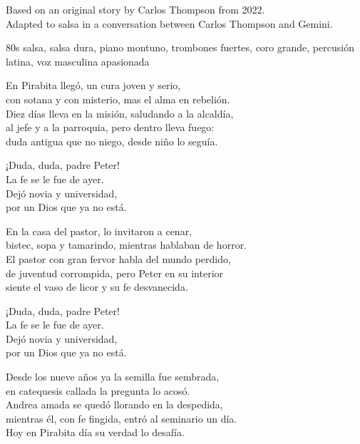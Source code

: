 

\begin{notes}
Based on an original story by Carlos Thompson from 2022.\\
Adapted to salsa in a conversation between Carlos Thompson and Gemini.
\end{notes}
\begin{style}
80s salsa, salsa dura, piano montuno, trombones fuertes, coro grande, percusión latina, voz masculina apasionada
\end{style}
\begin{lyrics}
En Pirabita llegó, un cura joven y serio,\\
con sotana y con misterio, mas el alma en rebelión.\\
Diez días lleva en la misión, saludando a la alcaldía,\\
al jefe y a la parroquia, pero dentro lleva fuego:\\
duda antigua que no niego, desde niño lo seguía.

¡Duda, duda, padre Peter!\\
La fe se le fue de ayer.\\
Dejó novia y universidad,\\
por un Dios que ya no está.

En la casa del pastor, lo invitaron a cenar,\\
bistec, sopa y tamarindo, mientras hablaban de horror.\\
El pastor con gran fervor habla del mundo perdido,\\
de juventud corrompida, pero Peter en su interior\\
siente el vaso de licor y su fe desvanecida.

¡Duda, duda, padre Peter!\\
La fe se le fue de ayer.\\
Dejó novia y universidad,\\
por un Dios que ya no está.

Desde los nueve años ya la semilla fue sembrada,\\
en catequesis callada la pregunta lo acosó.\\
Andrea amada se quedó llorando en la despedida,\\
mientras él, con fe fingida, entró al seminario un día.\\
Hoy en Pirabita día su verdad lo desafía.


\end{lyrics}
